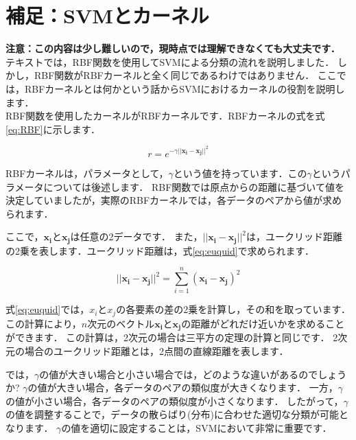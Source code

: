 \documentclass{jarticle}
\begin{document}
\section{補足：SVMとカーネル}
\textbf{注意：この内容は少し難しいので，現時点では理解できなくても大丈夫です．}\\

テキストでは，RBF関数を使用してSVMによる分類の流れを説明しました．
しかし，RBF関数がRBFカーネルと全く同じであるわけではありません．
ここでは，RBFカーネルとは何かという話からSVMにおけるカーネルの役割を説明します．\\

RBF関数を使用したカーネルがRBFカーネルです．RBFカーネルの式を式\ref{eq:RBF}に示します．

\begin{equation}\label{eq:RBF}
  r = e^{-\gamma ||\bm{x_i} - \bm{x_j}||^2}
\end{equation}

RBFカーネルは，パラメータとして，$\gamma $という値を持っています．この$\gamma$というパラメータについては後述します．
RBF関数では原点からの距離に基づいて値を決定していましたが，実際のRBFカーネルでは，各データのペアから値が求められます．

ここで，$\bm{x_i}$と$\bm{x_j}$は任意の2データです．
また，$||\bm{x_i} - \bm{x_j}||^2$は，ユークリッド距離の2乗を表します．ユークリッド距離は，式\ref{eq:euquid}で求められます．

\begin{equation}\label{eq:euquid}
  ||\bm{x_i} - \bm{x_j}||^2 = \sum_{i=1}^{n}(\bm{x_i} - \bm{x_j})^2
\end{equation}

式\ref{eq:euquid}では，$x_i$と$x_j$の各要素の差の2乗を計算し，その和を取っています．
この計算により，$n$次元のベクトル$\bm{x_i}$と$\bm{x_j}$の距離がどれだけ近いかを求めることができます．
この計算は，2次元の場合は三平方の定理の計算と同じです．
2次元の場合のユークリッド距離とは，2点間の直線距離を表します．

では，$\gamma$の値が大きい場合と小さい場合では，どのような違いがあるのでしょうか?
$\gamma$の値が大きい場合，各データのペアの類似度が大きくなります．
一方，$\gamma$の値が小さい場合，各データのペアの類似度が小さくなります．
したがって，$\gamma$の値を調整することで，データの散らばり(分布)に合わせた適切な分類が可能となります．
$\gamma$の値を適切に設定することは，SVMにおいて非常に重要です．
\end{document}

